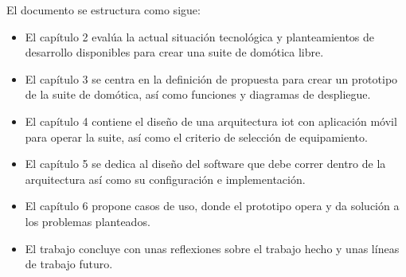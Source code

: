 El documento se estructura como sigue:

\begin{itemize}
  \item El capítulo 2 evalúa la actual situación tecnológica y planteamientos de desarrollo disponibles para crear una suite de domótica libre.

  \item El capítulo 3 se centra en la definición de propuesta para crear un prototipo de la suite de domótica, así como funciones y diagramas de despliegue.

  \item El capítulo 4 contiene el diseño de una arquitectura \gls{iot} con aplicación móvil para operar la suite, así como el criterio de selección de equipamiento.

  \item El capítulo 5 se dedica al diseño del software que debe correr dentro de la arquitectura así como su configuración e implementación.

  \item El capítulo 6 propone casos de uso, donde el prototipo opera y da solución a los problemas planteados.

  \item El trabajo concluye con unas reflexiones sobre el trabajo hecho y unas líneas de trabajo futuro.
\end{itemize}
